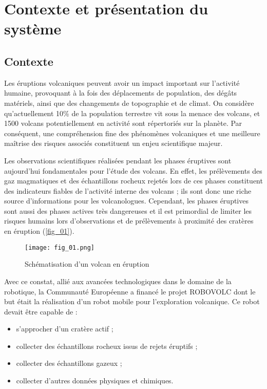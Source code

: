 % 
% 
\section{Contexte et présentation du système}
\subsection{Contexte}

\ifprof
\else
Les éruptions volcaniques peuvent avoir un impact important sur l'activité humaine, provoquant à
la fois des déplacements de population, des dégâts matériels, ainsi que des changements de
topographie et de climat. On considère qu'actuellement 10\% de la population terrestre vit sous la
menace des volcans, et 1500 volcans potentiellement en activité sont répertoriés sur la planète.
Par conséquent, une compréhension fine des phénomènes volcaniques et une meilleure maîtrise
des risques associés constituent un enjeu scientifique majeur.

Les observations scientifiques réalisées pendant les phases éruptives sont aujourd'hui
fondamentales pour l'étude des volcans. En effet, les prélèvements des gaz magmatiques et des
échantillons rocheux rejetés lors de ces phases constituent des indicateurs fiables de l'activité
interne des volcans ; ils sont donc une riche source d'informations pour les volcanologues.
Cependant, les phases éruptives sont aussi des phases actives très dangereuses et il est
primordial de limiter les risques humains lors d'observations et de prélèvements à proximité des
cratères en éruption (\autoref{fig_01}). 



\begin{figure}[H]
\centering
\texttt{[image: fig\_01.png]}
\caption{Schématisation d'un volcan en éruption \label{fig_01}}
\end{figure}


Avec ce constat, allié aux avancées technologiques dans le domaine de la robotique, la
Communauté Européenne a financé le projet ROBOVOLC dont le but était la réalisation d'un robot
mobile pour l'exploration volcanique. Ce robot devait être capable de :
\begin{itemize}
\item s'approcher d'un cratère actif ;
\item collecter des échantillons rocheux issus de rejets éruptifs ;
\item collecter des échantillons gazeux ;
\item collecter d'autres données physiques et chimiques.
\end{itemize}
\fi

